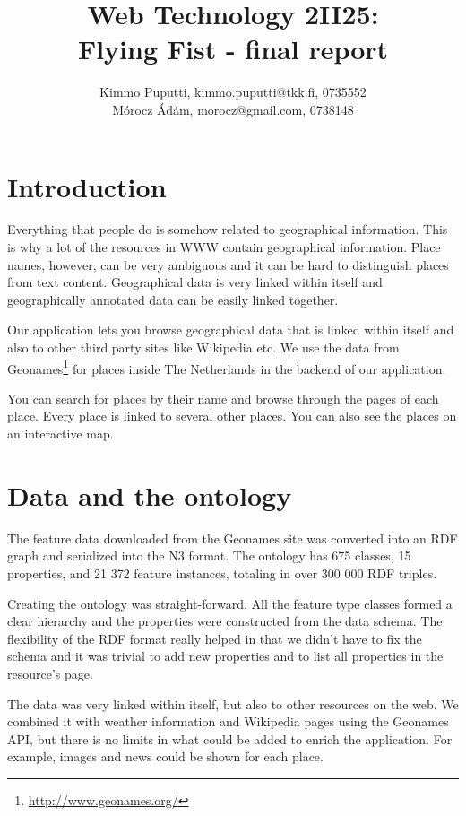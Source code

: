 \documentclass[a4paper,12pt]{article}
\title{Web Technology 2II25:\\Flying Fist - final report}
\author{Kimmo Puputti, kimmo.puputti@tkk.fi, 0735552\\M\'orocz \'Ad\'am, morocz@gmail.com, 0738148}
\begin{document}
\maketitle

\section{Introduction}

Everything that people do is somehow related to geographical
information. This is why a lot of the resources in WWW contain
geographical information. Place names, however, can be very ambiguous
and it can be hard to distinguish places from text
content. Geographical data is very linked within itself and
geographically annotated data can be easily linked together.

Our application lets you browse geographical data that is linked
within itself and also to other third party sites like Wikipedia
etc. We use the data from
Geonames\footnote{\url{http://www.geonames.org/}} for places inside
The Netherlands in the backend of our application.

You can search for places by their name and browse through the pages
of each place. Every place is linked to several other places. You can
also see the places on an interactive map.

\section{Data and the ontology}

The feature data downloaded from the Geonames site was converted into
an RDF graph and serialized into the N3 format. The ontology has 675
classes, 15 properties, and 21 372 feature instances, totaling in over
300 000 RDF triples.

Creating the ontology was straight-forward. All the feature type
classes formed a clear hierarchy and the properties were constructed
from the data schema. The flexibility of the RDF format really helped
in that we didn't have to fix the schema and it was trivial to add new
properties and to list all properties in the resource's page.

The data was very linked within itself, but also to other resources on
the web. We combined it with weather information and Wikipedia pages
using the Geonames API, but there is no limits in what could be added
to enrich the application. For example, images and news could be shown
for each place.
\end{document}
